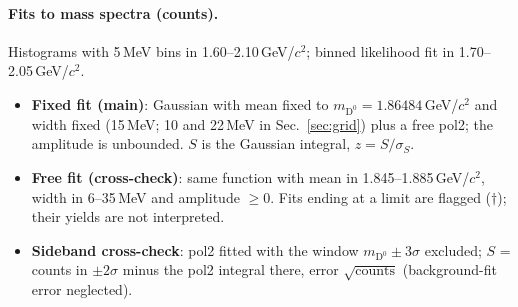 \paragraph{Fits to mass spectra (counts).} Histograms with 5\,MeV bins in 1.60--2.10\,GeV/$c^2$; binned likelihood fit in
1.70--2.05\,GeV/$c^2$.
\begin{itemize}
\item \textbf{Fixed fit (main)}: Gaussian with mean fixed to $m_{\mathrm{D}^0}=1.86484$\,GeV/$c^2$ and width fixed
  (15\,MeV; 10 and 22\,MeV in Sec.~\ref{sec:grid}) plus a free pol2; the amplitude is unbounded. $S$ is the Gaussian
  integral, $z=S/\sigma_S$.
\item \textbf{Free fit (cross-check)}: same function with mean in 1.845--1.885\,GeV/$c^2$, width in 6--35\,MeV and
  amplitude $\ge0$. Fits ending at a limit are flagged ($\dagger$); their yields are not interpreted.
\item \textbf{Sideband cross-check}: pol2 fitted with the window $m_{\mathrm{D}^0}\pm3\sigma$ excluded; $S$ = counts in
  $\pm2\sigma$ minus the pol2 integral there, error $\sqrt{\text{counts}}$ (background-fit error neglected).
\end{itemize}



